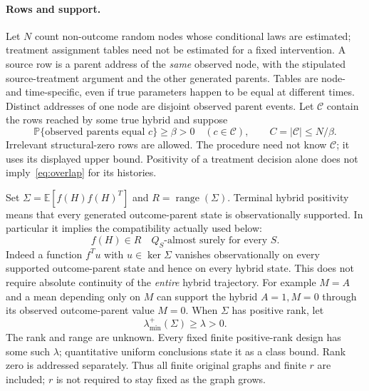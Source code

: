 \documentclass[11pt,a4paper]{article}
\numberwithin{equation}{section}
\theoremstyle{definition}
\newcommand{\E}{\mathbb E}
\newcommand{\Prb}{\mathbb P}
\DeclareMathOperator{\range}{range}
\begin{document}
\paragraph{Rows and support.}
Let $N$ count non-outcome random nodes whose conditional laws are estimated;
treatment assignment tables need not be estimated for a fixed intervention.
A source row is a parent address of the \emph{same} observed node, with
the stipulated source-treatment argument and the other generated parents.
Tables are node- and time-specific, even if true parameters happen to be
equal at different times. Distinct addresses of one node are disjoint
observed parent events. Let $\mathcal C$ contain the rows reached by some
true hybrid and suppose
\begin{equation}\label{eq:overlap}
 \Prb\{\text{observed parents equal }c\}\ge\beta>0
 \quad(c\in\mathcal C),\qquad C=|\mathcal C|\le N/\beta.
\end{equation}
Irrelevant structural-zero rows are allowed. The procedure need not know
$\mathcal C$; it uses its displayed upper bound. Positivity of a treatment
decision alone does not imply~\eqref{eq:overlap} for its histories.

Set $\Sigma=\E[f(H)f(H)^T]$ and $R=\range(\Sigma)$. Terminal hybrid
positivity means that every generated outcome-parent state is
observationally supported. In particular it implies the compatibility
actually used below:
\begin{equation}\label{eq:compat}
 f(H)\in R\quad Q_S\text{-almost surely for every }S.
\end{equation}
Indeed a function $f^T u$ with $u\in\ker\Sigma$ vanishes observationally
on every supported outcome-parent state and hence on every hybrid state.
This does not require absolute continuity of the \emph{entire} hybrid
trajectory. For example $M=A$ and a mean depending only on $M$ can support
the hybrid $A=1,M=0$ through its observed outcome-parent value $M=0$.
When $\Sigma$ has positive rank, let
\begin{equation}\label{eq:design}
 \lambda_{\min}^{+}(\Sigma)\ge\lambda>0.
\end{equation}
The rank and range are unknown. Every fixed finite positive-rank design
has some such $\lambda$; quantitative uniform conclusions state it as
a class bound. Rank zero is addressed separately. Thus all finite
original graphs and finite $r$ are included; $r$ is not required to stay
fixed as the graph grows.
\end{document}

